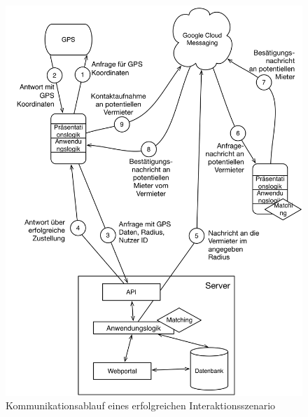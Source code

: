 \begin{figure}[H]
\includegraphics[width=.9\textwidth]{./images/kommunikationsablauf.png}
\caption{Kommunikationsablauf eines erfolgreichen Interaktionsszenario }
\label{fig:kommunikationsablauf}
\end{figure}



